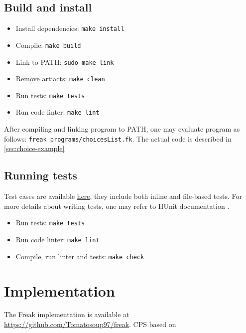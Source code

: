 \documentclass{article}
\theoremstyle{definition}
\theoremstyle{lemma}
\theoremstyle{observation}
\theoremstyle{theorem}
\newcommand*{\fullref}[1]{\hyperref[{#1}]{\autoref*{#1} \nameref*{#1}}}
\begin{document}
    \subsection{Build and install}

    \begin{itemize}
        \item Install dependencies: \verb!make install!
        \item Compile: \verb!make build!
        \item Link to PATH: \verb!sudo make link!
        \item Remove artiacts: \verb!make clean!
        \item Run tests: \verb!make tests!
        \item Run code linter: \verb!make lint!
    \end{itemize}

    After compiling and linking program to PATH, one may evaluate program as
    follows: \verb!freak programs/choicesList.fk!. The actual code is described in \fullref{sec:choice-example}

    \subsection{Running tests}

    Test cases are available \href{https://github.com/Tomatosoup97/freak/blob/master/src/Tests.hs}{\underline{here}},
    they include both inline and file-based tests. For more details about
    writing tests, one may refer to HUnit documentation \cite{hunit-docs}. \\

    \begin{itemize}
        \item Run tests: \verb!make tests!
        \item Run code linter: \verb!make lint!
        \item Compile, run linter and tests: \verb!make check!
    \end{itemize}

\section{Implementation}

    The Freak implementation is available at \href{https://github.com/Tomatosoup97/freak}{https://github.com/Tomatosoup97/freak}.
    CPS based on \cite{appel-continuations}
\end{document}
